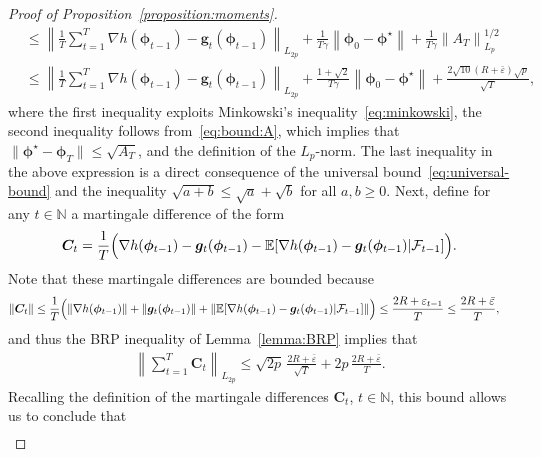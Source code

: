 \documentclass[11pt, a4paper, oneside, reqno]{article}
\begin{document}
\begin{proof}[Proof of Proposition~\ref{proposition:moments}]
\begin{align*}
		&\leq \left\| \frac{1}{T} \sum_{t=1}^T \nabla h(\bm \phi_{t-1}) - \bm g_t(\bm \phi_{t-1}) \right\|_{L_{2p}} + \frac{1}{T \gamma} \left\| \bm \phi_0 - \bm \phi^\star \right\| + \frac{1}{T \gamma} \left\| A_T \right\|_{L_{p}}^{1/2} \\
		&\leq \left\| \frac{1}{T} \sum_{t=1}^T \nabla h(\bm \phi_{t-1}) - \bm g_t(\bm \phi_{t-1}) \right\|_{L_{2p}} + \frac{1 + \sqrt{2}}{T \gamma} \left\| \bm \phi_0 - \bm \phi^\star \right\| + \frac{2 \sqrt{10} \left( R + \bar \varepsilon \right) \sqrt{p}}{\sqrt{T}},
		\end{align*}
		where the first inequality exploits Minkowski's inequality~\eqref{eq:minkowski}, the second inequality follows from~\eqref{eq:bound:A}, which implies that $\| \bm \phi^\star - \bm \phi_T \| \leq \sqrt{A_T}$, and the definition of the $L_p$-norm. The last inequality in the above expression is a direct consequence of the universal bound~\eqref{eq:universal-bound} and the inequality $ \sqrt{a+b} \leq \sqrt{a} + \sqrt{b}$ for all $a,b\ge 0$. Next, define for any $t\in\mathbb N$ a martingale difference of the form
		$$\bm C_t = \frac{1}{T} \Big( \nabla h(\bm \phi_{t-1}) - \bm g_t(\bm \phi_{t-1}) - \mathbb{E}[\nabla h(\bm \phi_{t-1}) - \bm g_t(\bm \phi_{t-1}) | \mathcal F_{t-1}] \Big).$$
		Note that these martingale differences are bounded because
		\begin{align*}
		\| \bm C_t \| 
		&\leq \frac{1}{T} \Big( \| \nabla h(\bm \phi_{t-1}) \| + \| \bm g_t(\bm \phi_{t-1}) \| + \| \mathbb{E}[\nabla h(\bm \phi_{t-1}) - \bm g_t(\bm \phi_{t-1}) | \mathcal F_{t-1}] \| \Big) \leq \frac{2R + \varepsilon_{t-1}}{T} \leq \frac{2R + \bar \varepsilon}{T},
		\end{align*}
		and thus the BRP inequality of Lemma~\ref{lemma:BRP} implies that
		\begin{align*}
		    \left\| \sum_{t=1}^T \bm C_t \right\|_{L_{2p}} \leq \sqrt{2p} \, \frac{2R + \bar \varepsilon}{\sqrt{T}} + 2p \, \frac{2R + \bar \varepsilon}{T}.
		\end{align*}
		Recalling the definition of the martingale differences $\bm C_t$, $t\in\mathbb N$, this bound allows us to conclude that
		\begin{align*}

\end{align*}
\end{proof}
\end{document}
